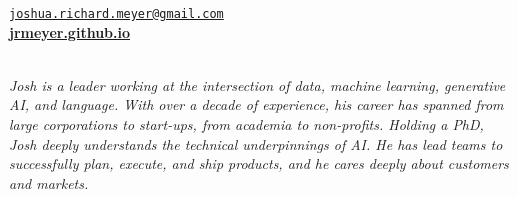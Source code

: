 \documentclass{resume} %
\begin{document}
\vspace{-.25cm}
\begin{center}
\href{mailto:joshua.richard.meyer@gmail.com}{\nolinkurl{joshua.richard.meyer@gmail.com}}\\
\vspace{.15cm}
\href{https://jrmeyer.github.io}{\textbf{jrmeyer.github.io}} \\
\vspace{.15cm}
 \href{https://www.linkedin.com/in/josh-r-meyer/}{\faLinkedin} \hspace{.25cm} \href{https://github.com/JRMeyer}{\faGithub} \\

\vspace{.5cm}

\textit{Josh is a leader working at the intersection of data, machine learning, generative AI, and language. With over a decade of experience, his career has spanned from large corporations to start-ups, from academia to non-profits. Holding a PhD, Josh deeply understands the technical underpinnings of AI. He has lead teams to successfully plan, execute, and ship products, and he cares deeply about customers and markets.}

\vspace{.5cm}

\end{center}


\vspace{.25cm}
\end{document}
